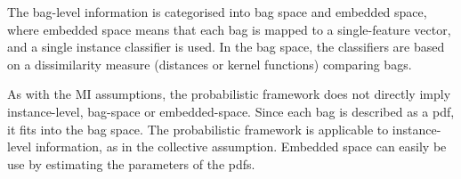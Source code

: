 The bag-level information is categorised into bag space and embedded space, where embedded space means that each bag is mapped to a single-feature vector, and a single instance classifier is used. 
In the bag space, the classifiers are based on a dissimilarity measure (distances or kernel functions) comparing bags.

As with the MI assumptions, the probabilistic framework does not directly imply instance-level, bag-space or embedded-space. 
Since each bag is described as a pdf, it fits into the bag space. 
The probabilistic framework is applicable to instance-level information, as in the collective assumption. 
Embedded space can easily be use by estimating the parameters of the pdfs. 
